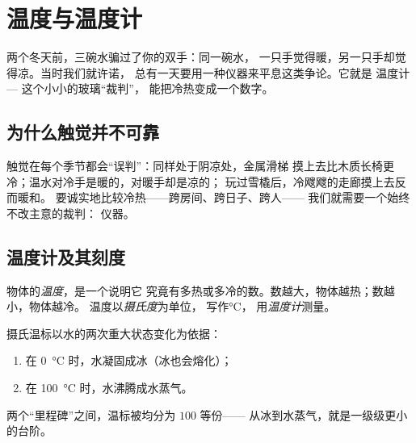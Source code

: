 \chapter{温度与温度计}\label{ch:g3:temperature-thermometers}

两个冬天前，三碗水骗过了你的双手：同一碗水，
一只手觉得暖，另一只手却觉得凉。当时我们就许诺，
总有一天要用一种仪器来平息这类争论。它就是
温度计 --- 这个小小的玻璃“裁判”，
能把冷热变成一个数字。

\section{为什么触觉并不可靠}

\begin{example}[不公正的“裁判”]\label{ex:g3:temperature-thermometers:unfair}
触觉在每个季节都会“误判”：同样处于阴凉处，金属滑梯
摸上去比木质长椅更冷；温水对冷手是暖的，对暖手却是凉的；
玩过雪橇后，冷飕飕的走廊摸上去反而暖和。
要诚实地比较冷热——跨房间、跨日子、跨人——
我们就需要一个始终不改主意的裁判：
仪器。
\end{example}

\section{温度计及其刻度}

\begin{definition}[温度]\label{def:g3:temperature-thermometers:temperature}
物体的\emph{温度}，是一个说明它
究竟有多热或多冷的数。数越大，物体越热；数越小，物体越冷。
温度以\emph{摄氏度}为单位，
写作\unit{\celsius}，
用\emph{温度计}测量。
\end{definition}

\begin{proposition}\label{prop:g3:temperature-thermometers:milestones}
摄氏温标以水的两次重大状态变化为依据：
\begin{enumerate}
  \item 在 \qty{0}{\celsius} 时，水凝固成冰（冰也会熔化）；
  \item 在 \qty{100}{\celsius} 时，水沸腾成水蒸气。
\end{enumerate}
两个“里程碑”之间，温标被均分为 $100$ 等份——
从冰到水蒸气，就是一级级更小的台阶。
\end{proposition}

